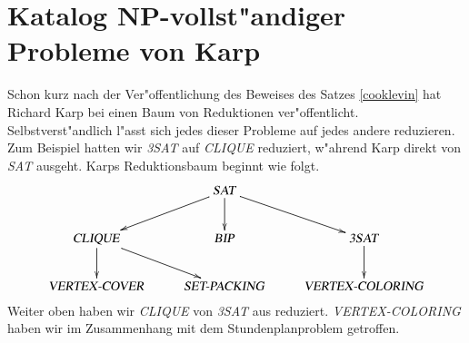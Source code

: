 %
%
%
%

\section{Katalog NP-vollst"andiger Probleme von Karp}
Schon kurz nach der Ver"offentlichung des Beweises des Satzes
\ref{cooklevin} hat Richard Karp bei einen Baum von Reduktionen
ver"offentlicht.
Selbstverst"andlich l"asst
sich jedes dieser Probleme auf jedes andere reduzieren. Zum Beispiel
hatten wir \textsl{3SAT} auf \textsl{CLIQUE} reduziert, w"ahrend
Karp direkt von \textsl{SAT} ausgeht. Karps Reduktionsbaum
beginnt wie folgt.
\[
\xymatrix{
{}
	&\text{\textsl{SAT}} \ar[dl] \ar[d] \ar[dr]
\\
\text{\textsl{CLIQUE}} \ar[d] \ar[dr]
	&\text{\textsl{BIP}}
		&\text{\textsl{3SAT}} \ar[d]
\\
\text{\textsl{VERTEX-COVER}}
	&\text{\textsl{SET-PACKING}}
		&\text{\textsl{VERTEX-COLORING}}
}
\]
Weiter oben haben wir \textsl{CLIQUE} von \textsl{3SAT} aus
reduziert. \textsl{VERTEX-COLORING} haben wir im Zusammenhang
mit dem Stundenplanproblem getroffen.

